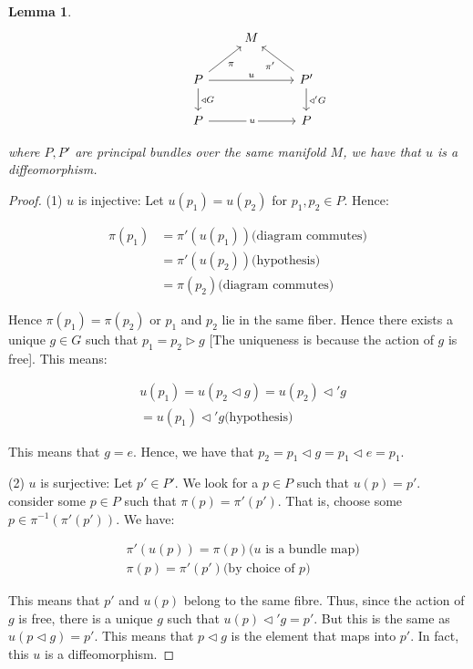 \documentclass[11pt]{book}
\newtheorem{lemma}[theorem]{Lemma}
\newtheorem{proof}[theorem]{Proof}
\begin{document}
\begin{lemma}
\[\begin{tikzcd}
	{} && M \\
	& P && {P'} \\
	& P && P
	\arrow["u", from=2-2, to=2-4]
	\arrow["\pi"', from=2-2, to=1-3]
	\arrow["{\pi'}", from=2-4, to=1-3]
	\arrow["{\triangleleft G}", from=2-2, to=3-2]
	\arrow["{\triangleleft' G}", from=2-4, to=3-4]
	\arrow["u"{description}, from=3-2, to=3-4]
\end{tikzcd}\]

where $P, P'$ are principal bundles over the same manifold $M$, we have that $u$ is a diffeomorphism.
\end{lemma}
\begin{proof}
(1) $u$ is injective: Let $u(p_1) = u(p_2)$ for $p_1, p_2 \in P$.  Hence:


\begin{align*}
\pi(p_1)
&= \pi'(u(p_1)) \text{(diagram commutes)} \\
&= \pi'(u(p_2)) \text{(hypothesis)} \\
&= \pi(p_2) \text{(diagram commutes)}
\end{align*}

Hence $\pi(p_1) = \pi(p_2)$ or $p_1$ and $p_2$ lie in the same fiber. Hence there
exists a unique $g \in G$ such that $p_1 = p_2 \triangleright g$ [The uniqueness
is because the action of $g$ is free]. This means:


\begin{align*}
&u(p_1) = u(p_2 \triangleleft g) = u(p_2) \triangleleft' g \\
&= u(p_1) \triangleleft' g \text{(hypothesis)}
\end{align*}



This means that $g = e$. Hence, we have that $p_2 = p_1 \triangleleft g = p_1 \triangleleft e = p_1$.

(2) $u$ is surjective: Let $p' \in P'$. We look for a $p \in P$ such that $u(p) = p'$.
consider some $p \in P$ such that $\pi(p) = \pi'(p')$. That is, choose some $p \in \pi^{-1}(\pi'(p'))$.
We have:


\begin{align*}
&\pi'(u(p)) = \pi(p) \text{($u$ is a bundle map)} \\
&\pi(p) = \pi'(p') \text{(by choice of $p$)} 
\end{align*}


This means that $p'$ and $u(p)$ belong to the same fibre. Thus, since the action of $g$
is free, there is a unique $g$ such that $u(p) \triangleleft' g = p'$.
But this is the same as $u(p \triangleleft g) = p'$. This means that $p \triangleleft g$
is the element that maps into $p'$. In fact, this $u$ is a diffeomorphism.
\end{proof}
\end{document}
